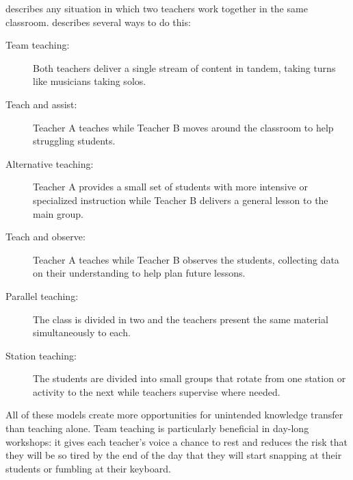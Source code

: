 
 describes any situation
in which two teachers work together in the same classroom.
\cite{Frie2016} describes several ways to do this:

\begin{description}

\item[Team teaching:]
  Both teachers deliver a single stream of content in tandem,
  taking turns like musicians taking solos.

\item[Teach and assist:]
  Teacher A teaches while Teacher B moves around the classroom
  to help struggling students.

\item[Alternative teaching:]
  Teacher A provides a small set of students with more intensive or specialized instruction
  while Teacher B delivers a general lesson to the main group.

\item[Teach and observe:]
  Teacher A teaches while Teacher B observes the students,
  collecting data on their understanding to help plan future lessons.

\item[Parallel teaching:]
  The class is divided in two
  and the teachers present the same material simultaneously to each.

\item[Station teaching:]
  The students are divided into small groups
  that rotate from one station or activity to the next
  while teachers supervise where needed.

\end{description}

All of these models create more opportunities for unintended knowledge transfer than teaching alone.
Team teaching is particularly beneficial in day-long workshops:
it gives each teacher's voice a chance to rest
and reduces the risk that they will be so tired by the end of the day
that they will start snapping at their students
or fumbling at their keyboard.

